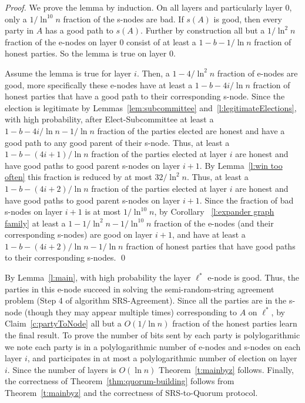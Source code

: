 \documentclass[11pt,letter]{article}
\theoremstyle{mytheoremstyle}
\newcommand{\toplev}{\ell^*}
\newcommand{\rs}{semi-random-string agreement\xspace}
\newcommand{\es}{\mbox{\textsf{Elect-Subcommittee}}\xspace}
\newcommand{\rsAlg}{\mbox{\textsf{SRS-Agreement}}\xspace}
\newcommand{\rsToQ}{\mbox{\textsf{SRS-to-Quorum}}\xspace}
\begin{document}
\begin{proof}
	We prove the lemma by induction. On all layers and particularly layer 0, only a $1/\ln^{10} n$ fraction of the \textsf{s-node}s are bad. If $s(A)$ is good, then every party in $A$ has a good path to $s(A)$. Further by construction all but a $1/\ln^2 n$ fraction of the \textsf{e-node}s on layer 0 consist of at least a $1-b - 1/\ln n$ fraction of honest parties. So the lemma is true on layer 0.
	
	Assume the lemma is true for layer $i$. Then, a $1- 4/\ln^2 n$ fraction of \textsf{e-node}s are good, more specifically these \textsf{e-node}s have at least a $1 - b - 4i/\ln n$ fraction of honest parties that have a good path to their corresponding \textsf{s-node}. Since the election is legitimate by Lemmas~\ref{lem:subcommittee}
	and~\ref{l:legitimateElections}, with high probability, after \es at least a $1 - b - 4i/\ln n - 1/\ln n$ fraction of the parties elected are honest and have a good path to any good parent of their \textsf{s-node}. Thus, at least a $1 - b - (4i + 1)/\ln n$ fraction of the parties elected at layer $i$ are honest and have good paths to good parent \textsf{s-node}s on layer $i+1$. By Lemma~\ref{l:win too often} this fraction is reduced by at most $32/\ln^2 n$. Thus, at least a $1 - b - (4i + 2)/\ln n$ fraction of the parties elected at layer $i$ are honest and have good paths to good parent \textsf{s-node}s on layer $i+1$. Since the fraction of bad \textsf{s-node}s on layer $i+1$ is at most $1/\ln^{10} n$, by Corollary ~\ref{l:expander graph family} at least a $1-1/\ln^2n - 1/\ln^{10} n$ fraction of the
	\textsf{e-node}s (and their corresponding \textsf{s-node}s) are good on layer $i+1$, and have at least a $1 - b - (4i + 2)/\ln n - 1/\ln n$ fraction of honest parties that have good paths to their corresponding \textsf{s-node}s.
	\qed
\end{proof}

By Lemma~\ref{l:main}, with high probability the layer $\toplev$ \textsf{e-node} is good.
Thus, the parties in this \textsf{e-node} succeed in solving the \rs problem (Step 4 of algorithm \rsAlg). Since all the parties are in the \textsf{s-node} (though they may appear multiple times) corresponding to $A$ on $\toplev$, by Claim~\ref{c:partyToNode} all but a $O(1/\ln n)$ fraction of the honest parties learn the final result.
To prove the number of bits sent by each party is polylogarithmic we note each party is in a polylogarithmic number of \textsf{e-node}s and \textsf{s-node}s on each layer $i$, and participates in at most a polylogarithmic number of election on layer $i$. Since the number of layers is $O(\ln n)$ Theorem~\ref{t:mainbyz} follows. Finally, the correctness of Theorem~\ref{thm:quorum-building} follows from Theorem~\ref{t:mainbyz} and the correctness of \rsToQ protocol.
\end{document}
